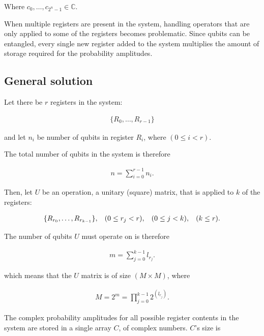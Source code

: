 Where $c_0,\dots{},c_{2^n-1}\in{}\mathds{C}$.

When multiple registers are present in the system, handling operators that are only applied to some of the registers becomes problematic. Since qubits can be entangled, every single new register added to the system multiplies the amount of storage required for the probability amplitudes.

\subsection{General solution}

Let there be $r$ registers in the system: 

\begin{align*}
\{R_0, \dots{}, R_{r-1}\}
\end{align*}

and let $n_i$ be number of qubits in register $R_i$, where $(0\leq{}i<r)$.

The total number of qubits in the system is therefore

\begin{align*}
    n = \sum\limits_{i=0}^{r-1}n_{i}.
\end{align*}

Then, let $U$ be an operation, a unitary (square) matrix, that is applied to $k$ of the registers:

\begin{align*}
\{R_{r_0},\dots{},R_{r_{k-1}}\},\hspace{3mm} (0\leq{}r_j<r),\hspace{3mm} (0\leq{}j<k),\hspace{3mm} (k\leq{}r).
\end{align*}

The number of qubits $U$ must operate on is therefore

\begin{align*}
    m = \sum\limits_{j=0}^{k-1}l_{r_j}.
\end{align*}

which means that the $U$ matrix is of size $(M\times{}M)$, where

\begin{align*}
M = 2^m = \prod\limits_{j=0}^{k-1} 2^{(l_{r_j})}.
\end{align*}

The complex probability amplitudes for all possible register contents in the system are stored in a single array $C$, of complex numbers. $C$'s size is 

